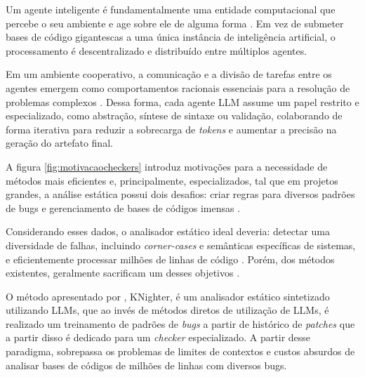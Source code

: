 \documentclass[
    12pt,                %
    openright,           %
    oneside,             %
    a4paper,             %
    english,             %
    brazil               %
]{abntex2}
\begin{document}
Um agente inteligente é fundamentalmente uma entidade computacional que percebe o seu ambiente e age sobre ele de alguma forma \cite{russell2020artificial}.
Em vez de submeter bases de código gigantescas a uma única instância de inteligência artificial, o processamento é descentralizado e distribuído entre múltiplos agentes.
\par
Em um ambiente cooperativo, a comunicação e a divisão de tarefas entre os agentes emergem como comportamentos racionais essenciais para a resolução de problemas complexos \cite{russell2020artificial}.
Dessa forma, cada agente LLM assume um papel restrito e especializado, como abstração, síntese de sintaxe ou validação, colaborando de forma iterativa para reduzir a sobrecarga de \textit{tokens} e aumentar a precisão na geração do artefato final.
\par
A figura \ref{fig:motivacaocheckers} introduz motivações para a necessidade de métodos mais eficientes e, principalmente, especializados, tal que em projetos grandes, a análise estática possui dois desafios: criar regras para diversos padrões de bugs e gerenciamento de bases de códigos imensas \cite{yang2025knighter}.
\par
Considerando esses dados, o analisador estático ideal deveria: detectar uma diversidade de falhas, incluindo \textit{corner-cases} e semânticas específicas de sistemas, e eficientemente processar milhões de linhas de código \cite{yang2025knighter}.
Porém, dos métodos existentes, geralmente sacrificam um desses objetivos \cite{yang2025knighter}.
\par
O método apresentado por , KNighter, é um analisador estático sintetizado utilizando LLMs, que ao invés de métodos diretos de utilização de LLMs, é realizado um treinamento de padrões de \textit{bugs} a partir de histórico de \textit{patches} que a partir disso é dedicado para um \textit{checker} especializado.
A partir desse paradigma,  sobrepassa os problemas de limites de contextos e custos absurdos de analisar bases de códigos de milhões de linhas com diversos bugs.
\end{document}
